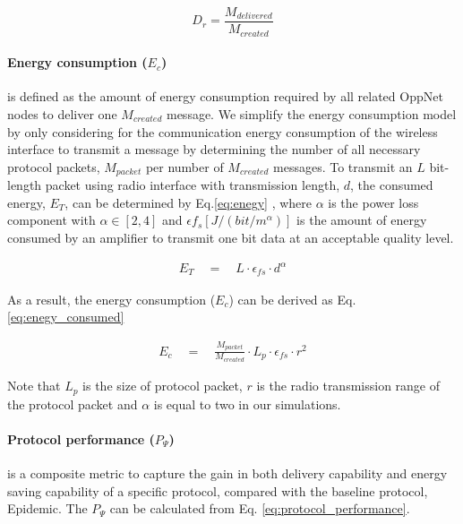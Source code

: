\documentclass[conference]{IEEEtran}
\begin{document}
	\begin{equation}
	\label{delivery_ratio}
	D_{r} =\frac { { M }_{ delivered } }{ { M }_{ created } } 
	\end{equation}

\paragraph{Energy consumption ($E_{c}$)} is defined as the amount of energy consumption required by all related OppNet nodes to deliver one $M_{created}$ message.
We simplify the energy consumption model by only considering for the communication energy consumption of the wireless interface to transmit a message by determining the number of all necessary protocol packets, $M_{packet}$ per number of $M_{created}$ messages.
To transmit an $L$ bit-length packet using radio interface with transmission length, $d$, the consumed energy, ${ E }_{ T }$, can be determined by Eq.\ref{eq:enegy} \cite{Yang2010, Wang2006}, where $\alpha$ is the power loss component with $\alpha \in \left[ 2,4 \right]$ and $\epsilon { f }_{ s }\left[ J/(bit/{ m }^{ \alpha  }) \right]$ is the amount of energy consumed by an amplifier to transmit one bit data at an acceptable quality level.

\begin{eqnarray}
	\label{eq:enegy}
	{ E }_{ T }\quad =\quad L\cdot  { \epsilon  }_{ fs } \cdot  { d }^{ \alpha  }
\end{eqnarray} 

As a result, the energy consumption ($E_c$) can be derived as Eq. \ref{eq:enegy_consumed} 

\begin{eqnarray}
	\label{eq:enegy_consumed}
	{ E }_{ c }\quad =\quad \frac{M_{packet}}{M_{created}} \cdot L_p \cdot  { \epsilon  }_{ fs } \cdot  { r }^{ 2 }
\end{eqnarray} 

Note that $L_p$ is the size of protocol packet, $r$ is the radio transmission range of the protocol packet and $\alpha$ is equal to two in our simulations.
\paragraph{Protocol performance ($P_{\Psi}$)} is a composite metric to capture the gain in both delivery capability and energy saving capability of a specific protocol, compared with the baseline protocol, Epidemic.
The $P_{\Psi}$ can be calculated from Eq. \ref{eq:protocol_performance}.
\end{document}
